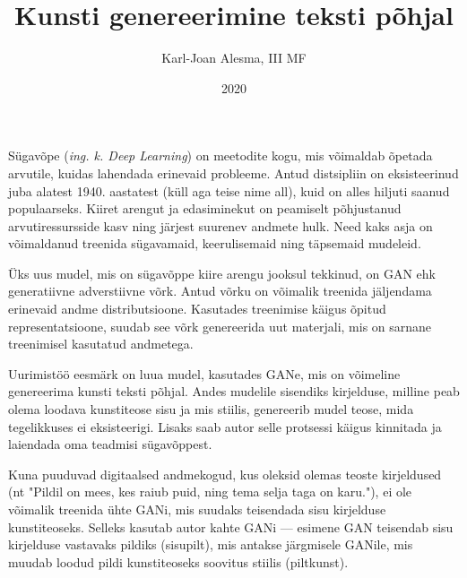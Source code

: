 \documentclass{vilgym}
\title{Kunsti genereerimine teksti põhjal}
\author{Karl-Joan Alesma, III MF}
\date{2020}
\begin{document}
	\maketitle
	\tableofcontents



	\newcommand*{\ingk}[1]{(\textit{ing. k. #1})}

	Sügavõpe \ingk{Deep Learning} on meetodite kogu, mis võimaldab õpetada arvutile, kuidas lahendada erinevaid probleeme. Antud distsipliin on eksisteerinud juba alatest 1940. aastatest (küll aga teise nime all), kuid on alles hiljuti saanud populaarseks. Kiiret arengut ja edasiminekut on peamiselt põhjustanud arvutiressursside kasv ning järjest suurenev andmete hulk. Need kaks asja on võimaldanud treenida sügavamaid, keerulisemaid ning täpsemaid mudeleid. \parencite{deeplearningbook}	 

	Üks uus mudel, mis on sügavõppe kiire arengu jooksul tekkinud, on GAN ehk generatiivne adverstiivne võrk. Antud võrku on võimalik treenida jäljendama erinevaid andme distributsioone. Kasutades treenimise käigus õpitud representatsioone, suudab see võrk genereerida uut materjali, mis on sarnane treenimisel kasutatud andmetega. \parencite{gan}

	Uurimistöö eesmärk on luua mudel, kasutades GANe, mis on võimeline genereerima kunsti teksti põhjal. Andes mudelile sisendiks kirjelduse, milline peab olema loodava kunstiteose sisu ja mis stiilis, genereerib mudel teose, mida tegelikkuses ei eksisteerigi. Lisaks saab autor selle protsessi käigus kinnitada ja laiendada oma teadmisi sügavõppest.

	Kuna puuduvad digitaalsed andmekogud, kus oleksid olemas teoste kirjeldused (nt "Pildil on mees, kes raiub puid, ning tema selja taga on karu."), ei ole võimalik treenida ühte GANi, mis suudaks teisendada sisu kirjelduse kunstiteoseks. Selleks kasutab autor kahte GANi --- esimene GAN teisendab sisu kirjelduse vastavaks pildiks (sisu\textrightarrow pilt), mis antakse järgmisele GANile, mis muudab loodud pildi kunstiteoseks soovitus stiilis (pilt\textrightarrow kunst).
\end{document}
